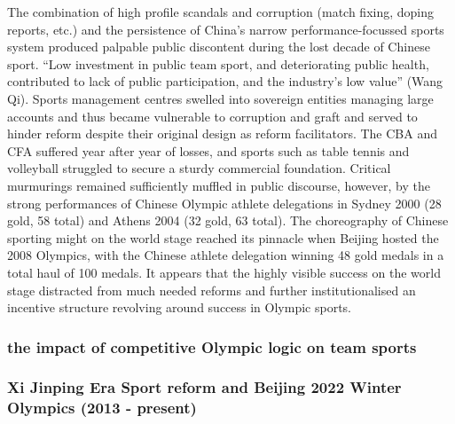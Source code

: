{The combination of high profile scandals and corruption (match fixing, doping reports, etc.) and the persistence of China's narrow performance-focussed sports system produced palpable public discontent during the lost decade of Chinese sport. ``Low investment in public team sport, and deteriorating public health, contributed to lack of public participation, and the industry’s low value'' (Wang Qi). Sports management centres swelled into sovereign entities managing large accounts and thus became vulnerable to corruption and graft and served to hinder reform despite their original design as reform facilitators. The CBA and CFA suffered year after year of losses, and sports such as table tennis and volleyball struggled to secure a sturdy commercial foundation. Critical murmurings remained sufficiently muffled in public discourse, however, by the strong performances of Chinese Olympic athlete delegations in Sydney 2000 (28 gold, 58 total) and Athens 2004 (32 gold, 63 total). The choreography of Chinese sporting might on the world stage reached its pinnacle when Beijing hosted the 2008 Olympics, with the Chinese athlete delegation winning 48 gold medals in a total haul of 100 medals.  It appears that the highly visible success on the world stage distracted from much needed reforms and further institutionalised an incentive structure revolving around success in Olympic sports.

\subsubsection{the impact of competitive Olympic logic on team sports}







\subsubsection{Xi Jinping Era Sport reform and Beijing 2022 Winter Olympics (2013 - present)}

}
